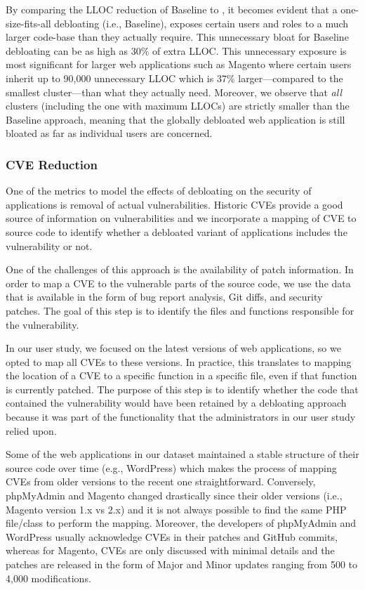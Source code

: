 By comparing the LLOC reduction of Baseline to \dbltr{}, it becomes evident that a one-size-fits-all debloating (i.e., Baseline), exposes certain users and roles to a much larger code-base than they actually require. 
This unnecessary bloat for Baseline debloating can be as high as 30\% of extra LLOC. 
This unnecessary exposure is most significant for larger web applications such as Magento where certain users inherit up to 90,000 unnecessary LLOC which is 37\% larger---compared to the smallest \dbltr{} cluster---than what they actually need. 
Moreover, we observe that \emph{all} \dbltr{} clusters (including the one with maximum LLOCs) are strictly smaller than the Baseline approach, meaning that the globally debloated web application is still bloated as far as individual users are concerned.

\subsubsection{CVE Reduction}

One of the metrics to model the effects of debloating on the security of applications is removal of actual vulnerabilities. 
Historic CVEs provide a good source of information on vulnerabilities and we incorporate a mapping of CVE to source code to identify whether a debloated variant of applications includes the vulnerability or not. 

One of the challenges of this approach is the availability of patch information. 
In order to map a CVE to the vulnerable parts of the source code, we use the data that is available in the form of bug report analysis, Git diffs, and security patches. 
The goal of this step is to identify the files and functions responsible for the vulnerability. 

In our user study, we focused on the latest versions of web applications, so we opted to map all CVEs to these versions. 
In practice, this translates to mapping the location of a CVE to a specific function in a specific file, even if that function is currently patched. 
The purpose of this step is to identify whether the code that contained the vulnerability would have been retained by a debloating approach because it was part of the functionality that the administrators in our user study relied upon.

Some of the web applications in our dataset maintained a stable structure of their source code over time (e.g., WordPress) which makes the process of mapping CVEs from older versions to the recent one straightforward. 
Conversely, phpMyAdmin and Magento changed drastically since their older versions (i.e., Magento version 1.x vs 2.x) and it is not always possible to find the same PHP file/class to perform the mapping. 
Moreover, the developers of phpMyAdmin and WordPress usually acknowledge CVEs in their patches and GitHub commits, whereas for Magento, CVEs are only discussed with minimal details and the patches are released in the form of Major and Minor updates ranging from 500 to 4,000 modifications.

